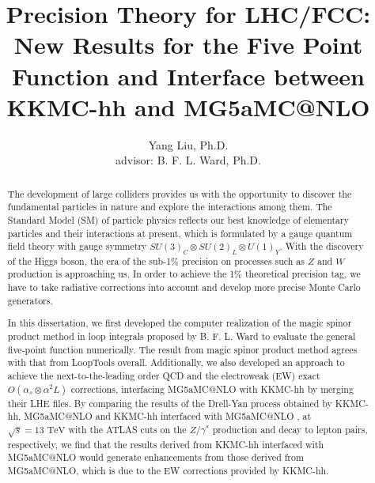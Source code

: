 \documentclass{article}
\begin{document}
\title{Precision Theory for LHC/FCC: New Results for the Five Point Function and Interface between KKMC-hh and MG5\textunderscore aMC@NLO}
\author{Yang Liu, Ph.D.\\advisor: B. F. L. Ward, Ph.D.}
\maketitle
\begin{abstract}
	The development of large colliders provides us with the opportunity to discover the fundamental particles in nature and explore the interactions among them. The Standard Model (SM) of particle physics reflects our best knowledge of elementary particles and their interactions at present, which is formulated by a gauge quantum field theory with gauge symmetry $SU(3)_C \otimes SU(2)_L \otimes U(1)_Y$. With the discovery of the Higgs boson, the era of the sub-1\% precision on processes such as $Z$ and
	$W$ production is approaching us. In order to achieve the 1\% theoretical precision tag, we have to take radiative corrections into account and develop more precise Monte Carlo generators.
	
	In this dissertation, we first developed the computer realization of the magic spinor product method in loop integrals proposed by B. F. L. Ward to evaluate the general five-point function
	numerically. The result from magic spinor product method agrees with that from LoopTools overall. Additionally, we also developed an approach to achieve the next-to-the-leading order QCD and the electroweak (EW) exact $O(\alpha_s\otimes\alpha^2L)$ corrections, interfacing MG5\textunderscore aMC@NLO with KKMC-hh by merging their LHE files. By comparing the results of the Drell-Yan process obtained by KKMC-hh, MG5\textunderscore aMC@NLO and KKMC-hh interfaced with MG5\textunderscore aMC@NLO , at $\sqrt{s}=13\text{ TeV}$ with the ATLAS cuts on the $Z/\gamma^\ast$ production and decay to lepton pairs, respectively, we find that the results derived from KKMC-hh interfaced with MG5\textunderscore aMC@NLO would generate enhancements from those derived from MG5\textunderscore aMC@NLO, which is due to the EW corrections provided by KKMC-hh.
\end{abstract}
\end{document}
